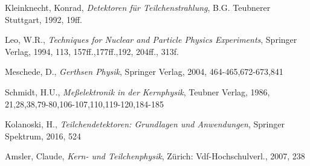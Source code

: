 \documentclass[ngerman,11pt]{article}
\begin{document}
\newpage
\begin{thebibliography}{9}

	 Kleinknecht, Konrad, \textit{Detektoren für Teilchenstrahlung}, B.G. Teubnerer Stuttgart, 1992, 19ff.

	 Leo, W.R., \textit{Techniques for Nuclear and Particle Physics Experiments}, Springer Verlag, 1994, 113, 157ff.,177ff.,192, 204ff., 313f.

	 Meschede, D., \textit{Gerthsen Physik}, Springer Verlag, 2004, 464-465,672-673,841

	 Schmidt, H.U., \textit{Meßelektronik in der Kernphysik}, Teubner Verlag, 1986, 21,28,38,79-80,106-107,110,119-120,184-185

	 Kolanoski, H., \textit{Teilchendetektoren: Grundlagen und Anwendungen}, Springer Spektrum, 2016, 524

	 Amsler, Claude, \textit{Kern- und Teilchenphysik}, Zürich: Vdf-Hochschulverl., 2007, 238
\end{thebibliography}

\end{document}
